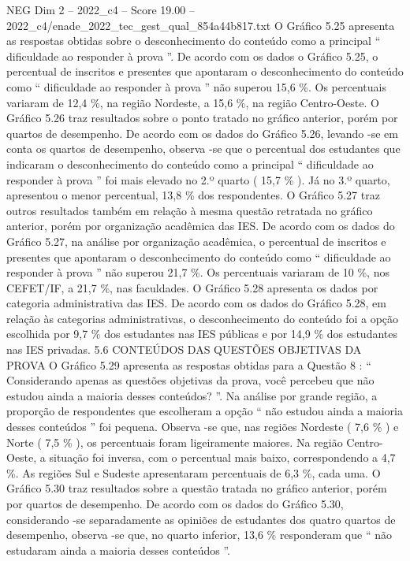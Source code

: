\begin{textsample}{NEG Dim 2 – 2022\_c4 – Score 19.00 – 2022\_c4/enade\_2022\_tec\_gest\_qual\_854a44b817.txt}
O Gráfico 5.25 apresenta as respostas obtidas sobre o desconhecimento do conteúdo como a principal “ dificuldade ao responder à prova ”.
De acordo com os dados o Gráfico 5.25, o percentual de inscritos e presentes que apontaram o desconhecimento do conteúdo como “ dificuldade ao responder à prova ” não superou 15,6 \%.
Os percentuais variaram de 12,4 \%, na região Nordeste, a 15,6 \%, na região Centro-Oeste.
O Gráfico 5.26 traz resultados sobre o ponto tratado no gráfico anterior, porém por quartos de desempenho.
De acordo com os dados do Gráfico 5.26, levando -se em conta os quartos de desempenho, observa -se que o percentual dos estudantes que indicaram o desconhecimento do conteúdo como a principal “ dificuldade ao responder à prova ” foi mais elevado no 2.º quarto ( 15,7 \% ).
Já no 3.º quarto, apresentou o menor percentual, 13,8 \% dos respondentes.
O Gráfico 5.27 traz outros resultados também em relação à mesma questão retratada no gráfico anterior, porém por organização acadêmica das IES.
De acordo com os dados do Gráfico 5.27, na análise por organização acadêmica, o percentual de inscritos e presentes que apontaram o desconhecimento do conteúdo como “ dificuldade ao responder à prova ” não superou 21,7 \%.
Os percentuais variaram de 10 \%, nos CEFET/IF, a 21,7 \%, nas faculdades.
O Gráfico 5.28 apresenta os dados por categoria administrativa das IES.
De acordo com os dados do Gráfico 5.28, em relação às categorias administrativas, o desconhecimento do conteúdo foi a opção escolhida por 9,7 \% dos estudantes nas IES públicas e por 14,9 \% dos estudantes nas IES privadas. 5.6 CONTEÚDOS DAS QUESTÕES OBJETIVAS DA PROVA O Gráfico 5.29 apresenta as respostas obtidas para a Questão 8 : “ Considerando apenas as questões objetivas da prova, você percebeu que não estudou ainda a maioria desses conteúdos? ”.
Na análise por grande região, a proporção de respondentes que escolheram a opção “ não estudou ainda a maioria desses conteúdos ” foi pequena.
Observa -se que, nas regiões Nordeste ( 7,6 \% ) e Norte ( 7,5 \% ), os percentuais foram ligeiramente maiores.
Na região Centro-Oeste, a situação foi inversa, com o percentual mais baixo, correspondendo a 4,7 \%.
As regiões Sul e Sudeste apresentaram percentuais de 6,3 \%, cada uma.
O Gráfico 5.30 traz resultados sobre a questão tratada no gráfico anterior, porém por quartos de desempenho.
De acordo com os dados do Gráfico 5.30, considerando -se separadamente as opiniões de estudantes dos quatro quartos de desempenho, observa -se que, no quarto inferior, 13,6 \% responderam que “ não estudaram ainda a maioria desses conteúdos ”.

\end{textsample}
